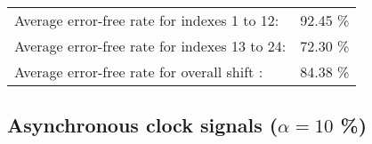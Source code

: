 \begin{table}[h]
\begin{center}
\begin{tabular}{|c|c|c|c|c|}
\end{tabular}


\flushleft
\begin{tabular}{l l}
Average error-free rate for indexes  1 to 12: & 92.45 \% \\
Average error-free rate for indexes 13 to 24: & 72.30 \% \\
Average error-free rate for overall shift   : & 84.38 \% \\

\end{tabular}


\end{center}
\end{table}




\pagebreak
\subsection{Asynchronous clock signals ($\alpha=10$ \%)}

